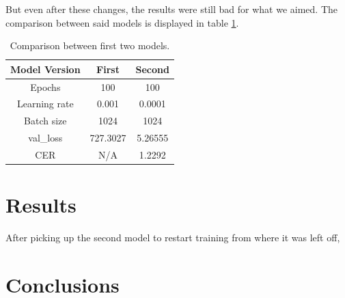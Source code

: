 \documentclass[11pt,letterpaper]{article}
\begin{document}
	But even after these changes, the results were still bad for what we aimed. The comparison between said models is displayed in table \ref{tab:model_comp}.
	
	\begin{table}[!h]
		\centering
		\begin{tabular}{|c|c|c|}
			\hline
			Model Version & First & Second \\
			\hline
			Epochs & 100 & 100 \\
			\hline
			Learning rate & 0.001 & 0.0001 \\
			\hline
			Batch size & 1024 & 1024 \\
			\hline
			val\_loss & 727.3027 & 5.26555 \\
			\hline
			CER & N/A & 1.2292 \\
			\hline
		\end{tabular}
		\caption{Comparison between first two models.}
		\label{tab:model_comp}
	\end{table}
	
	\section{Results}
	After picking up the second model to restart training from where it was left off, 
	
	\section{Conclusions}
	
	\bigskip
	
	
	
	
\end{document}
